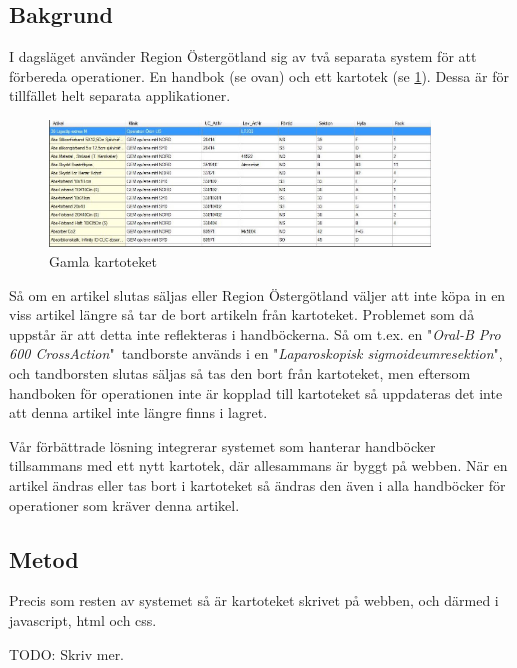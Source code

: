\clearpage
\subsection{Bakgrund}
I dagsläget använder Region Östergötland sig av två separata system
för att förbereda operationer. En handbok (se ovan) och ett kartotek (se \ref{fig:kartotek}).
Dessa är för tillfället helt separata applikationer.

\begin{figure}
  \centering
  \includegraphics[width=0.9\textwidth]{../images/forradsinfo.jpg}
  \caption{Gamla kartoteket}
  \label{fig:kartotek}
\end{figure}

Så om en artikel slutas säljas eller Region Östergötland
väljer att inte köpa in en viss artikel längre så tar de bort artikeln
från kartoteket. Problemet som då uppstår är att detta inte reflekteras
i handböckerna. Så om t.ex. en "\textit{Oral-B Pro 600 CrossAction}"\ tandborste används i
en "\textit{Laparoskopisk sigmoideumresektion}", och tandborsten slutas säljas
så tas den bort från kartoteket, men eftersom handboken för operationen inte är
kopplad till kartoteket så uppdateras det inte att denna artikel inte längre finns i lagret.

Vår förbättrade lösning
integrerar systemet som hanterar handböcker tillsammans med ett nytt kartotek,
där allesammans är byggt på webben. När en artikel ändras eller tas bort i kartoteket
så ändras den även i alla handböcker för operationer som kräver denna artikel.



\subsection{Metod}
Precis som resten av systemet så är kartoteket skrivet på webben, och
därmed i javascript, html och css.

TODO: Skriv mer.

